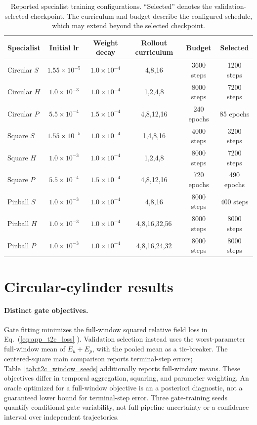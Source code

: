 \documentclass{article}
\def\plaineqref#1{\ref{#1}}
\providecommand{\DIFaddtex}[1]{{\protect\color{blue} \sf #1}} %
\providecommand{\DIFdeltex}[1]{{\protect\color{red} \scriptsize #1}} %
\providecommand{\DIFaddbegin}{} %
\providecommand{\DIFdelbegin}{} %
\providecommand{\DIFdelend}{} %
\providecommand{\DIFadd}[1]{\texorpdfstring{\DIFaddtex{#1}}{#1}} %
\providecommand{\DIFdel}[1]{\texorpdfstring{\DIFdeltex{#1}}{}} %
\begin{document}
\begin{table}[H]
\centering
\caption{
Reported specialist training configurations. ``Selected'' denotes the validation-selected checkpoint. The curriculum and budget describe the configured schedule, which may extend beyond the selected checkpoint.
}
\label{tab:specialist_training}
\small
\setlength{\tabcolsep}{3.5pt}
\begin{tabular}{@{}lccccc@{}}
\toprule
Specialist & Initial lr & Weight decay & Rollout curriculum & Budget & Selected \\
\midrule
Circular $S$
& $1.55{\times}10^{-5}$ & $1.0{\times}10^{-4}$
& 4,8,16 & 3600 steps & 1200 steps \\
Circular $H$
& $1.0{\times}10^{-3}$ & $1.0{\times}10^{-4}$
& 1,2,4,8 & 8000 steps & 7200 steps \\
Circular $P$
& $5.5{\times}10^{-4}$ & $1.5{\times}10^{-4}$
& 4,8,12,16 & 240 epochs & 85 epochs \\
\addlinespace
Square $S$
& $1.55{\times}10^{-5}$ & $1.0{\times}10^{-4}$
& 1,4,8,16 & 4000 steps & 3200 steps \\
Square $H$
& $1.0{\times}10^{-3}$ & $1.0{\times}10^{-4}$
& 1,2,4,8 & 8000 steps & 7200 steps \\
Square $P$
& $5.5{\times}10^{-4}$ & $1.5{\times}10^{-4}$
& 4,8,12,16 & 720 epochs & 490 epochs \\
\addlinespace
Pinball $S$
& $1.0{\times}10^{-3}$ & $1.0{\times}10^{-4}$
& 4,8,16 & 8000 steps & 400 steps \\
Pinball $H$
& $1.0{\times}10^{-3}$ & $1.0{\times}10^{-4}$
& 4,8,16,32,56 & 8000 steps & 8000 steps \\
Pinball $P$
& $1.0{\times}10^{-3}$ & $1.0{\times}10^{-4}$
& 4,8,16,24,32 & 8000 steps & 8000 steps \\
\bottomrule
\end{tabular}
\end{table}


\par

\DIFdelbegin \section{\DIFdel{Circular-cylinder results}}
\addtocounter{section}{-1}%
\DIFdelend \DIFaddbegin \paragraph{\DIFadd{Distinct gate objectives.}}
\DIFadd{Gate fitting minimizes the full-window squared relative field loss in Eq.~(}\plaineqref{eq:app_t2c_loss}\DIFadd{). Validation selection instead uses the worst-parameter full-window mean of $E_u+E_p$, with the pooled mean as a tie-breaker. The centered-square main comparison reports terminal-step errors; Table~\ref{tab:t2c_window_seeds} additionally reports full-window means. These objectives differ in temporal aggregation, squaring, and parameter weighting. An oracle optimized for a full-window objective is an a posteriori diagnostic, not a guaranteed lower bound for terminal-step error. Three gate-training seeds quantify conditional gate variability, not full-pipeline uncertainty or a confidence interval over independent trajectories.
}
\end{document}
